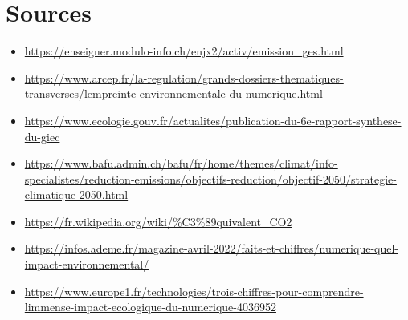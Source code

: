 \documentclass[11pt, a4paper]{book}
\begin{document}
\section*{Sources}
\begin{itemize}
    \item \url{https://enseigner.modulo-info.ch/enjx2/activ/emission_ges.html}
    \item \url{https://www.arcep.fr/la-regulation/grands-dossiers-thematiques-transverses/lempreinte-environnementale-du-numerique.html}
    \item \url{https://www.ecologie.gouv.fr/actualites/publication-du-6e-rapport-synthese-du-giec}
    \item \url{https://www.bafu.admin.ch/bafu/fr/home/themes/climat/info-specialistes/reduction-emissions/objectifs-reduction/objectif-2050/strategie-climatique-2050.html}
    \item \url{https://fr.wikipedia.org/wiki/%C3%89quivalent_CO2}
    \item \url{https://infos.ademe.fr/magazine-avril-2022/faits-et-chiffres/numerique-quel-impact-environnemental/}
    \item \url{https://www.europe1.fr/technologies/trois-chiffres-pour-comprendre-limmense-impact-ecologique-du-numerique-4036952}
\end{itemize}
\end{document}
